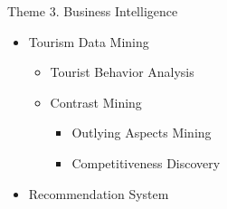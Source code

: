 \documentclass[
 size=14pt,
 paper=smartboard,  %
 mode=present, 		%
 display=slides, 	%
 style=tuliplab,  	%
 pauseslide,
 fleqn,leqno]{powerdot}
\begin{document}



\begin{slide}{Theme 3. Business Intelligence}


\begin{itemize}
\item
Tourism Data Mining

\begin{itemize}
\item
Tourist Behavior Analysis

\item
Contrast Mining

\begin{itemize}

\item
Outlying Aspects Mining

\item
Competitiveness Discovery

\end{itemize}

\end{itemize}

\item
Recommendation System

\end{itemize}

\end{slide}
\end{document}
